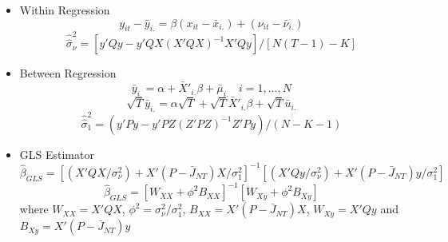 \documentclass[11pt]{beamer}
\begin{document}
\begin{frame}
\begin{itemize}
    \item Within Regression
        \begin{equation}
        y_{it} - \bar y_{i.} = \beta(x_{it} - \bar x_{i.}) + (\nu_{it} - \bar\nu_{i.})
        \end{equation}
        \begin{equation}
        {\widehat{\widehat{\sigma}}}_\nu^2 = [y'Qy - y'QX(X'QX)^{-1}X'Qy]/[N(T - 1) - K]
        \end{equation}
    \item Between Regression
        \begin{equation}
        \bar y_{i.} = \alpha + \bar X'_{i.}\beta + \bar \mu_{i.} \ \ \ \ i = 1, \ldots, N
        \end{equation}
        \begin{equation}
        \sqrt T \bar y_{i.} = \alpha \sqrt T + \sqrt T \bar X'_{i.} \beta + \sqrt T \bar u_{i.}
        \end{equation}
        \begin{equation}
        {\widehat{\widehat{\sigma}}}_1^2 = (y'Py - y'PZ(Z'PZ)^{-1}Z'Py)/(N - K -1)
        \end{equation}
    \item GLS Estimator
        \begin{equation}
        \widehat\beta_{GLS} = [(X'QX/\sigma_\nu^2) + X'(P - \bar J_{NT})X/\sigma_1^2]^{-1}[(X'Qy/\sigma_\nu^2) + X'(P - \bar J_{NT})y/\sigma_1^2]
        \end{equation}
        \begin{equation}
        \widehat\beta_{GLS} = [W_{XX} + \phi^2B_{XX}]^{-1}[W_{Xy} + \phi^2B_{Xy}]
        \end{equation}
    where $W_{XX} = X'QX$, $\phi^2 = \sigma_\nu^2 / \sigma_1^2$, $B_{XX} = X'(P - \bar J_{NT})X$, $W_{Xy} = X'Qy$ and $B_{Xy} = X'(P - \bar J_{NT})y$
\end{itemize}
\end{frame}
\end{document}
